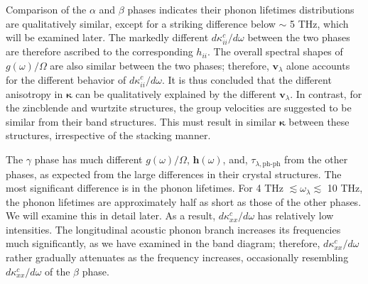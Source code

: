 \documentclass[twocolumn,amsmath,amssymb,a4paper,prb,superscriptaddress,floatfix]{revtex4-1}
\begin{document}
Comparison of the $\alpha$ and $\beta$ phases indicates their phonon lifetimes
distributions are qualitatively similar, except for a striking difference below
$\sim$ 5 THz, which will be examined later. The markedly different
$d\kappa_{ii}^c/d\omega$ between the two phases are therefore ascribed to the
corresponding $h_{ii}$. The overall spectral shapes of $g(\omega)/\Omega$ are also
similar between the two phases; therefore, $\mathbf{v}_\lambda$ alone accounts
for the different behavior of $d\kappa_{ii}^c/d\omega$. It is thus concluded
that the different anisotropy in $\boldsymbol{\kappa}$ can be qualitatively
explained by the different $\mathbf{v}_\lambda$.
In contrast, for the zincblende and wurtzite
structures, the group velocities are suggested to be similar from their band
structures\cite{phono3py}.
This must result in similar $\boldsymbol{\kappa}$ between these
structures, irrespective of the stacking manner. 

The $\gamma$ phase has much different $g(\omega)/\Omega$, $\boldsymbol{h}(\omega)$,
and, $\tau_{\lambda,\text{ph-ph}}$ from the other phases, as expected from the
large differences in their crystal structures. The most significant difference
is in the phonon lifetimes. For 4 THz $\lesssim\omega_\lambda\lesssim$ 10 THz,
the phonon lifetimes are approximately half as short as those of the other
phases. We will examine this in detail later. As a result,
$d\kappa_{xx}^c/d\omega$ has relatively low intensities. The longitudinal
acoustic phonon branch increases its frequencies much significantly, as we have
examined in the band diagram; therefore, $d\kappa_{xx}^c/d\omega$ rather
gradually attenuates as the frequency increases, occasionally resembling
$d\kappa_{xx}^c/d\omega$ of the $\beta$ phase.
\end{document}

